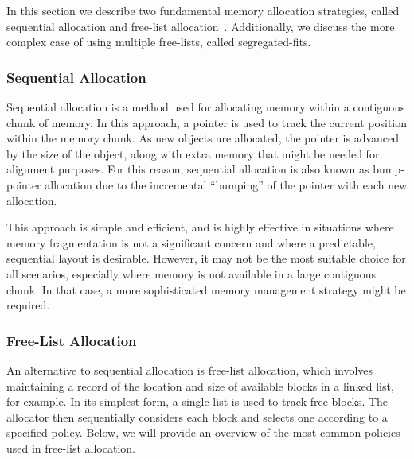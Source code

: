 
In this section we describe two fundamental memory allocation strategies, called sequential allocation and free-list allocation~\cite{gchandbook}. Additionally, we discuss the more complex case of using multiple free-lists, called segregated-fits.

\subsubsection{Sequential Allocation}
\label{sec:seq_allocation}
\label{sec:bump_pointer}

Sequential allocation is a method used for allocating memory within a contiguous chunk of memory. In this approach, a pointer is used to track the current position within the memory chunk. As new objects are allocated, the pointer is advanced by the size of the object, along with extra memory that might be needed for alignment purposes. For this reason, sequential allocation is also known as bump-pointer allocation due to the incremental ``bumping'' of the pointer with each new allocation. 

This approach is simple and efficient, and is highly effective in situations where memory fragmentation is not a significant concern and where a predictable, sequential layout is desirable. However, it may not be the most suitable choice for all scenarios, especially where memory is not available in a large contiguous chunk. In that case, a more sophisticated memory management strategy might be required. 

\subsubsection{Free-List Allocation}

An alternative to sequential allocation is free-list allocation, which involves maintaining a record of the location and size of available blocks in a linked list, for example. In its simplest form, a single list is used to track free blocks. The allocator then sequentially considers each block and selects one according to a specified policy. Below, we will provide an overview of the most common policies used in free-list allocation.

